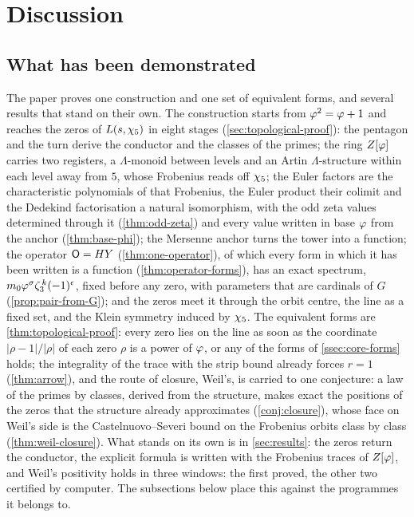 \section{Discussion}\label{sec:disc}

\subsection{What has been demonstrated}\label{sec:discussion}

The paper proves one construction and one set of equivalent forms, and several results that stand
on their own.  The construction starts from $\varphi^2=\varphi+1$ and reaches the
zeros of $L(s,\chi_5)$ in eight stages (\cref{sec:topological-proof}): the pentagon and
the turn derive the conductor and the classes of the primes; the ring $Z[\varphi]$
carries two registers, a $\Lambda$-monoid between levels and an Artin
$\Lambda$-structure within each level away from $5$, whose Frobenius reads off
$\chi_5$; the Euler factors are the characteristic polynomials of that Frobenius, the
Euler product their colimit and the Dedekind factorisation a natural isomorphism,
with the odd zeta values determined through it (\cref{thm:odd-zeta}) and every value
written in base $\varphi$ from the anchor (\cref{thm:base-phi}); the Mersenne anchor
turns the tower into a function; the operator $\mathsf{O}=HY$ (\cref{thm:one-operator}),
of which every form in which it has been written is a function (\cref{thm:operator-forms}), has an exact spectrum, $m_0\varphi^{\sigma}\zeta_3^{\,k}(-1)^{\epsilon}$, fixed before any zero, with parameters that are cardinals of $G$ (\cref{prop:pair-from-G}); and the
zeros meet it through the orbit centre, the line as a fixed set, and the Klein
symmetry induced by $\chi_5$.  The equivalent forms are \cref{thm:topological-proof}: every zero lies on the line as soon as the coordinate $|\rho-1|/|\rho|$ of each zero $\rho$ is a power of $\varphi$, or any of the forms of
\cref{ssec:core-forms} holds; the
integrality of the trace with the strip bound already forces $r=1$ (\cref{thm:arrow}), and the
route of closure, Weil's, is carried to one conjecture: a law of the primes by classes, derived from the structure, makes exact the positions of the zeros that the structure already approximates (\cref{conj:closure}), whose face on Weil's side is the Castelnuovo--Severi bound on
the Frobenius orbits class by class (\cref{thm:weil-closure}).  What stands on its own is in \cref{sec:results}: the zeros return the
conductor, the explicit formula is written with the Frobenius traces of $Z[\varphi]$, and
Weil's positivity holds in three windows: the first proved, the other two certified by
computer.  The subsections below place this
against the programmes it belongs to.

